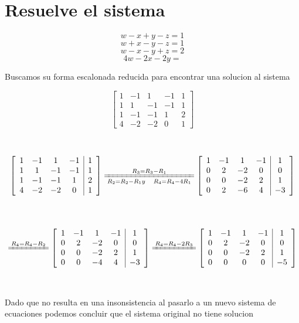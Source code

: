 \documentclass[a4paper,12pt]{article}
\begin{document}
\section{Resuelve el sistema}
\[ w - x +y - z=1\]
\[w+x-y-z= 1\]
\[w-x-y+z=2\]
\[4w - 2x -2y = \]

Buscamos su forma escalonada reducida para encontrar una solucion al sistema

 \[
        \left[\begin{array}{cccc|c}
        1 & -1 & 1 & -1 & 1\\
        1 & 1 & -1 & -1 & 1\\
        1 & -1 & -1 & 1 & 2 \\
        4 & -2 & -2 & 0 & 1

        \end{array}\right] 
    \] \\  \\  


     \[
        \left[\begin{array}{cccc|c}
        1 & -1 & 1 & -1 & 1\\
        1 & 1 & -1 & -1 & 1\\
        1 & -1 & -1 & 1 & 2 \\
        4 & -2 & -2 & 0 & 1
        \end{array}\right] 
        \xlongequal[R_2 = R_2 -R_1   y \quad R_4= R_4 - 4R_1]{R_3=R_3 - R_1}
        \left[\begin{array}{cccc|c}
        1 & -1 & 1 & -1 & 1\\
        0 & 2 & -2 & 0 & 0\\
        0 & 0 & -2 & 2 & 1 \\
        0 & 2 & -6 & 4 & -3
        \end{array}\right] 
    \] \\  \\  

 \[
        \xlongequal[]{R_4=R_4 - R_2}
        \left[\begin{array}{cccc|c}
        1 & -1 & 1 & -1 & 1\\
        0 & 2 & -2 & 0 & 0\\
        0 & 0 & -2 & 2 & 1 \\
        0 & 0 & -4 & 4 & -3
        \end{array}\right] 
        \xlongequal[]{R_4=R_4 - 2R_3}
        \left[\begin{array}{cccc|c}
        1 & -1 & 1 & -1 & 1\\
        0 & 2 & -2 & 0 & 0\\
        0 & 0 & -2 & 2 & 1 \\
        0 & 0 & 0 & 0 & -5
        \end{array}\right] 
    \] \\  \\  


Dado que no resulta en una insonsistencia al pasarlo a un nuevo sistema de ecuaciones podemos concluir que el sistema original no tiene solucion
\end{document}
